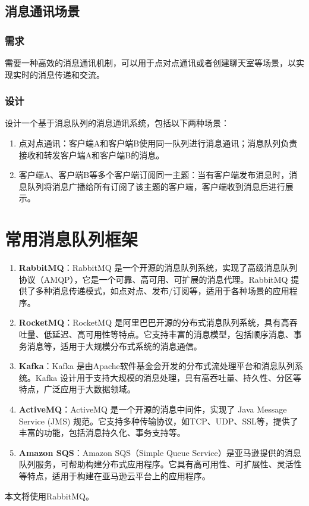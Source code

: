 \documentclass[11pt, a4paper, oneside, fontset=none]{ctexbook}
\begin{document}
\subsection{消息通讯场景}
\subsubsection{需求}
需要一种高效的消息通讯机制，可以用于点对点通讯或者创建聊天室等场景，以实现实时的消息传递和交流。

\subsubsection{设计}
设计一个基于消息队列的消息通讯系统，包括以下两种场景：
\begin{enumerate}
  \item 点对点通讯：客户端A和客户端B使用同一队列进行消息通讯；消息队列负责接收和转发客户端A和客户端B的消息。
  \item 客户端A、客户端B等多个客户端订阅同一主题：当有客户端发布消息时，消息队列将消息广播给所有订阅了该主题的客户端，客户端收到消息后进行展示。
\end{enumerate}

\section{常用消息队列框架}
\begin{enumerate}
  \item \textbf{RabbitMQ}：RabbitMQ 是一个开源的消息队列系统，实现了高级消息队列协议（AMQP），它是一个可靠、高可用、可扩展的消息代理。RabbitMQ 提供了多种消息传递模式，如点对点、发布/订阅等，适用于各种场景的应用程序。
  \item \textbf{RocketMQ}：RocketMQ 是阿里巴巴开源的分布式消息队列系统，具有高吞吐量、低延迟、高可用性等特点。它支持丰富的消息模型，包括顺序消息、事务消息等，适用于大规模分布式系统的消息通信。
  \item \textbf{Kafka}：Kafka 是由Apache软件基金会开发的分布式流处理平台和消息队列系统。Kafka 设计用于支持大规模的消息处理，具有高吞吐量、持久性、分区等特点，广泛应用于大数据领域。
  \item \textbf{ActiveMQ}：ActiveMQ 是一个开源的消息中间件，实现了 Java Message Service (JMS) 规范。它支持多种传输协议，如TCP、UDP、SSL等，提供了丰富的功能，包括消息持久化、事务支持等。
  \item \textbf{Amazon SQS}：Amazon SQS（Simple Queue Service）是亚马逊提供的消息队列服务，可帮助构建分布式应用程序。它具有高可用性、可扩展性、灵活性等特点，适用于构建在亚马逊云平台上的应用程序。
\end{enumerate}
本文将使用RabbitMQ。
\end{document}
